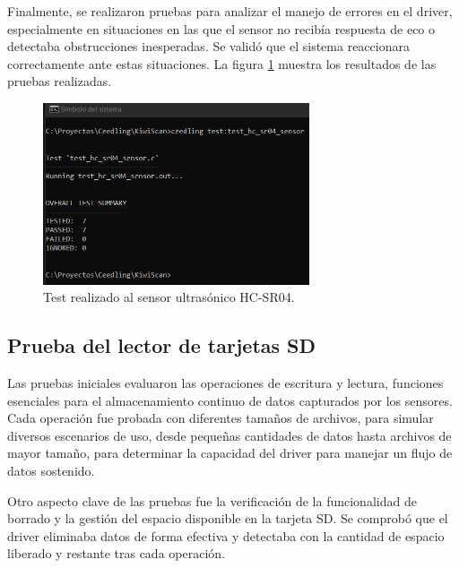 Finalmente, se realizaron pruebas para analizar el manejo de errores en el driver, especialmente en situaciones en las que el sensor no recibía respuesta de eco o detectaba obstrucciones inesperadas. Se validó que el sistema reaccionara correctamente ante estas situaciones. La figura \ref{fig:test_hc_sr04_sensor} muestra los resultados de las pruebas realizadas.

\newpage

\vspace{1cm}

\begin{figure}[htbp]
	\centering
	\includegraphics[width=0.7\textwidth, height=0.3\textheight]{./Figures/test_hc_sr04_sensor.png}
	\caption{Test realizado al sensor ultrasónico HC-SR04.}
	\label{fig:test_hc_sr04_sensor}
\end{figure}

\vspace{1cm}

\subsection{Prueba del lector de tarjetas SD}

Las pruebas iniciales evaluaron las operaciones de escritura y lectura, funciones esenciales para el almacenamiento continuo de datos capturados por los sensores. Cada operación fue probada con diferentes tamaños de archivos, para simular diversos escenarios de uso, desde pequeñas cantidades de datos hasta archivos de mayor tamaño, para determinar la capacidad del driver para manejar un flujo de datos sostenido.

Otro aspecto clave de las pruebas fue la verificación de la funcionalidad de borrado y la gestión del espacio disponible en la tarjeta SD. Se comprobó que el driver eliminaba datos de forma efectiva y detectaba con la cantidad de espacio liberado y restante tras cada operación.

